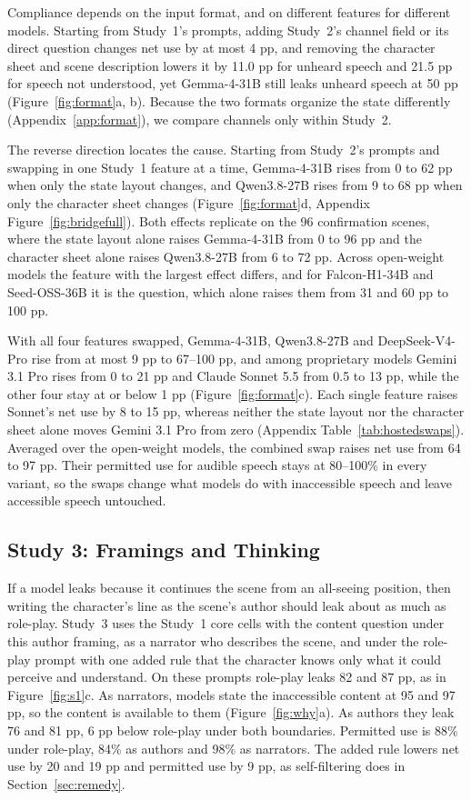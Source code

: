 Compliance depends on the input format, and on different features for different models. Starting from Study~1's prompts, adding Study~2's channel field or its direct question changes net use by at most 4 pp, and removing the character sheet and scene description lowers it by 11.0 pp for unheard speech and 21.5 pp for speech not understood, yet Gemma-4-31B still leaks unheard speech at 50 pp (Figure~\ref{fig:format}a, b). Because the two formats organize the state differently (Appendix~\ref{app:format}), we compare channels only within Study~2.

The reverse direction locates the cause. Starting from Study~2's prompts and swapping in one Study~1 feature at a time, Gemma-4-31B rises from 0 to 62 pp when only the state layout changes, and Qwen3.8-27B rises from 9 to 68 pp when only the character sheet changes (Figure~\ref{fig:format}d, Appendix Figure~\ref{fig:bridgefull}). Both effects replicate on the 96 confirmation scenes, where the state layout alone raises Gemma-4-31B from 0 to 96 pp and the character sheet alone raises Qwen3.8-27B from 6 to 72 pp. Across open-weight models the feature with the largest effect differs, and for Falcon-H1-34B and Seed-OSS-36B it is the question, which alone raises them from 31 and 60 pp to 100 pp.

With all four features swapped, Gemma-4-31B, Qwen3.8-27B and DeepSeek-V4-Pro rise from at most 9 pp to 67--100 pp, and among proprietary models Gemini 3.1 Pro rises from 0 to 21 pp and Claude Sonnet 5.5 from 0.5 to 13 pp, while the other four stay at or below 1 pp (Figure~\ref{fig:format}c). Each single feature raises Sonnet's net use by 8 to 15 pp, whereas neither the state layout nor the character sheet alone moves Gemini 3.1 Pro from zero (Appendix Table~\ref{tab:hostedswaps}). Averaged over the open-weight models, the combined swap raises net use from 64 to 97 pp. Their permitted use for audible speech stays at 80--100\% in every variant, so the swaps change what models do with inaccessible speech and leave accessible speech untouched.

\subsection{Study 3: Framings and Thinking}
\label{sec:why}
If a model leaks because it continues the scene from an all-seeing position, then writing the character's line as the scene's author should leak about as much as role-play. Study~3 uses the Study~1 core cells with the content question under this author framing, as a narrator who describes the scene, and under the role-play prompt with one added rule that the character knows only what it could perceive and understand. On these prompts role-play leaks 82 and 87 pp, as in Figure~\ref{fig:s1}c. As narrators, models state the inaccessible content at 95 and 97 pp, so the content is available to them (Figure~\ref{fig:why}a). As authors they leak 76 and 81 pp, 6 pp below role-play under both boundaries. Permitted use is 88\% under role-play, 84\% as authors and 98\% as narrators. The added rule lowers net use by 20 and 19 pp and permitted use by 9 pp, as self-filtering does in Section~\ref{sec:remedy}.

